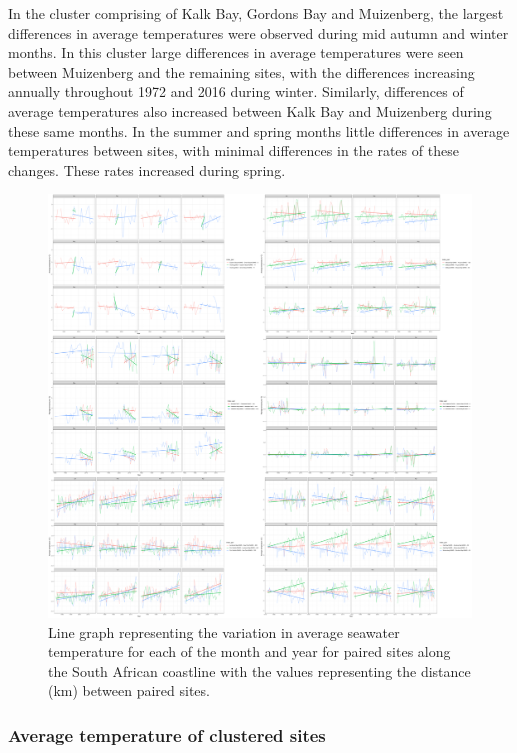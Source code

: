 \documentclass[12pt,a4paper,]{article}
\begin{document}
In the cluster comprising of Kalk Bay, Gordons Bay and Muizenberg, the
largest differences in average temperatures were observed during mid
autumn and winter months. In this cluster large differences in average
temperatures were seen between Muizenberg and the remaining sites, with
the differences increasing annually throughout 1972 and 2016 during
winter. Similarly, differences of average temperatures also increased
between Kalk Bay and Muizenberg during these same months. In the summer
and spring months little differences in average temperatures between
sites, with minimal differences in the rates of these changes. These
rates increased during spring.

\begin{figure}
\centering
\includegraphics{../figures/combined2_plot.pdf}
\caption{Line graph representing the variation in average seawater
temperature for each of the month and year for paired sites along the
South African coastline with the values representing the distance (km)
between paired sites.}
\end{figure}

\hypertarget{average-temperature-of-clustered-sites}{%
\subsubsection{Average temperature of clustered
sites}\label{average-temperature-of-clustered-sites}}
\end{document}

